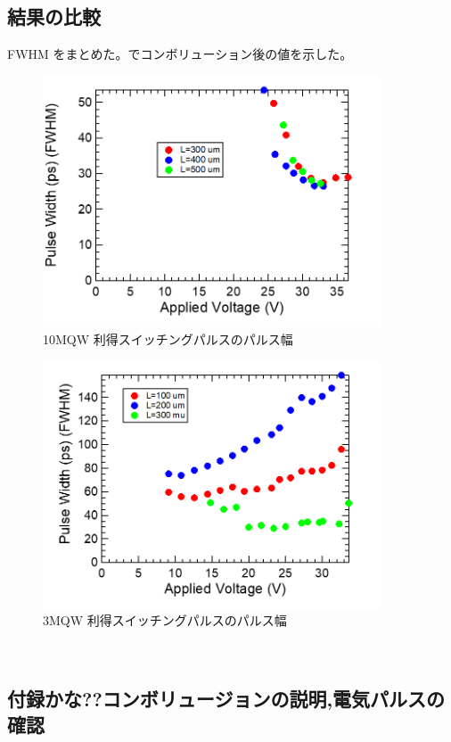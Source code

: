 \subsection{結果の比較}%
FWHM をまとめた。でコンボリューション後の値を示した。
\begin{figure}[h]
	\centering
	\includegraphics[width=10cm]{figure/fig_3_2_10QW_ridge_GS_FWHM.png}
		\caption{10MQW 利得スイッチングパルスのパルス幅}
		\label{fig:fig_3_2_10QW_ridge_GS_FWHM}
\end{figure}

\begin{figure}[h]
	\centering
	\includegraphics[width=10cm]{figure/fig_3_2_3QW_ridge_GS_FWHM.png}
		\caption{3MQW 利得スイッチングパルスのパルス幅}
		\label{fig:fig_3_2_3QW_ridge_GS_FWHM}
\end{figure}
\clearpage　
\subsection{付録かな??コンボリュージョンの説明,電気パルスの確認}%

